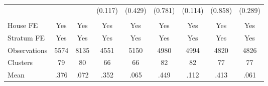 {\begin{tabular}{l*{8}{c}}
                &         &         &  (0.117)&  (0.429)&  (0.781)&  (0.114)&  (0.858)&  (0.289)\\
                &         &         &         &         &         &         &         &         \\
House FE        &      Yes&      Yes&      Yes&      Yes&      Yes&      Yes&      Yes&      Yes\\
Stratum FE      &      Yes&      Yes&      Yes&      Yes&      Yes&      Yes&      Yes&      Yes\\
\midrule
Observations    &     5574&     8135&     4551&     5150&     4980&     4994&     4820&     4826\\
Clusters        &       79&       80&       66&       66&       82&       82&       77&       77\\
Mean            &     .376&     .072&     .352&     .065&     .449&     .112&     .413&     .061\\
\bottomrule
\end{tabular}
}
